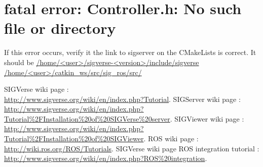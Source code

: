 \documentclass[notitlepage]{report}
\begin{document}
\section*{fatal error: Controller.h: No such file or directory
}
If this error occurs, verify it the link to sigserver on the CMakeLists is correct. It should be \url{/home/<user>/sigverse-<version>/include/sigverse /home/<user>/catkin_ws/src/sig_ros/src/}

\begin{thebibliography}{9}
          SIGVerse wiki page : \\
          \url{http://www.sigverse.org/wiki/en/index.php?Tutorial}.
          SIGServer wiki page : \\
          \url{http://www.sigverse.org/wiki/en/index.php?Tutorial%2FInstallation%20of%20SIGVerse%20server}.
          SIGViewer wiki page : \\
          \url{http://www.sigverse.org/wiki/en/index.php?Tutorial%2FInstallation%20of%20SIGViewer}.
          ROS wiki page :\\
          \url{http://wiki.ros.org/ROS/Tutorials}.
          SIGVerse wiki page ROS integration tutorial :\\
          \url{http://www.sigverse.org/wiki/en/index.php?ROS%20integration}.
     
\end{thebibliography}
\end{document}
